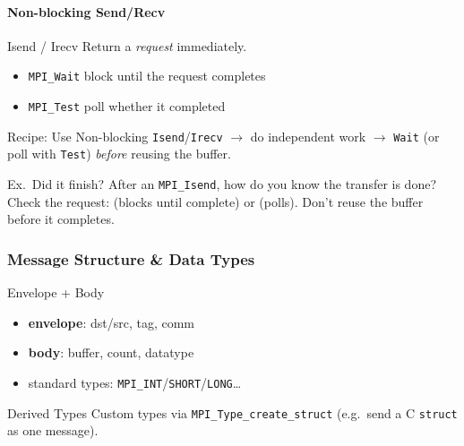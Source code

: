 \paragraph{Non-blocking Send/Recv}

\begin{definition}{Isend / Irecv}
    Return a \emph{request} immediately.
    \begin{itemize}
        \item \texttt{MPI\_Wait} block until the request completes
        \item \texttt{MPI\_Test} poll whether it completed
    \end{itemize}
\end{definition}

\begin{KR}{Recipe: Use Non-blocking}
    \texttt{Isend}/\texttt{Irecv} $\to$ do independent work $\to$ \texttt{Wait} (or poll with \texttt{Test}) \emph{before} reusing the buffer.
\end{KR}

\begin{example2}{Ex.\ Did it finish?}
    After an \texttt{MPI\_Isend}, how do you know the transfer is done?
     \\ 
    Check the request:  (blocks until complete) or  (polls). Don't reuse the buffer before it completes.
\end{example2}

\raggedcolumns
\columnbreak

\subsubsection{Message Structure \& Data Types}


\begin{definition}{Envelope + Body}
    \begin{itemize}
        \item \textbf{envelope}: dst/src, tag, comm
        \item \textbf{body}: buffer, count, datatype
        \item standard types: \texttt{MPI\_INT}/\texttt{SHORT}/\texttt{LONG}\ldots
    \end{itemize}
\end{definition}

\begin{definition}{Derived Types}
    Custom types via \texttt{MPI\_Type\_create\_struct} (e.g.\ send a C \texttt{struct} as one message).
\end{definition}

